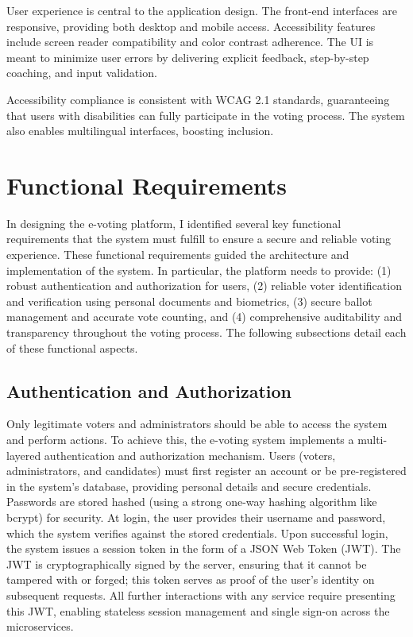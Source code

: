 \documentclass[a4paper,10pt]{report}
\begin{document}
User experience is central to the application design.  The front-end interfaces are responsive, providing both desktop and mobile access.  Accessibility features include screen reader compatibility and color contrast adherence.  The UI is meant to minimize user errors by delivering explicit feedback, step-by-step coaching, and input validation.

Accessibility compliance is consistent with WCAG 2.1 standards, guaranteeing that users with disabilities can fully participate in the voting process.  The system also enables multilingual interfaces, boosting inclusion.

\section{Functional Requirements}
In designing the e-voting platform, I identified several key functional requirements that the system must fulfill to ensure a secure and reliable voting experience. These functional requirements guided the architecture and implementation of the system. In particular, the platform needs to provide: (1) robust authentication and authorization for users, (2) reliable voter identification and verification using personal documents and biometrics, (3) secure ballot management and accurate vote counting, and (4) comprehensive auditability and transparency throughout the voting process. The following subsections detail each of these functional aspects.

\subsection{Authentication and Authorization}
Only legitimate voters and administrators should be able to access the system and perform actions. To achieve this, the e-voting system implements a multi-layered authentication and authorization mechanism. Users (voters, administrators, and candidates) must first register an account or be pre-registered in the system’s database, providing personal details and secure credentials. Passwords are stored hashed (using a strong one-way hashing algorithm like bcrypt) for security. At login, the user provides their username and password, which the system verifies against the stored credentials. Upon successful login, the system issues a session token in the form of a JSON Web Token (JWT). The JWT is cryptographically signed by the server, ensuring that it cannot be tampered with or forged; this token serves as proof of the user’s identity on subsequent requests. All further interactions with any service require presenting this JWT, enabling stateless session management and single sign-on across the microservices.
\end{document}
